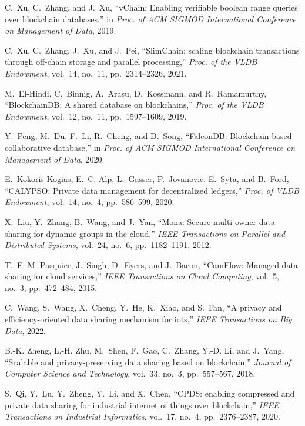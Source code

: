 \documentclass[11pt,divpdfm]{article}
\begin{document}
\begin{thebibliography}{10}
C.~Xu, C.~Zhang, and J.~Xu, ``{vChain}: Enabling verifiable boolean range
  queries over blockchain databases,'' in {\em Proc. of ACM SIGMOD
  International Conference on Management of Data}, 2019.

C.~Xu, C.~Zhang, J.~Xu, and J.~Pei, ``{SlimChain}: scaling blockchain
  transactions through off-chain storage and parallel processing,'' {\em Proc.
  of the VLDB Endowment}, vol.~14, no.~11, pp.~2314--2326, 2021.

M.~El-Hindi, C.~Binnig, A.~Arasu, D.~Kossmann, and R.~Ramamurthy,
  ``{BlockchainDB}: A shared database on blockchains,'' {\em Proc. of the VLDB
  Endowment}, vol.~12, no.~11, pp.~1597--1609, 2019.

Y.~Peng, M.~Du, F.~Li, R.~Cheng, and D.~Song, ``{FalconDB}: Blockchain-based
  collaborative database,'' in {\em Proc. of ACM SIGMOD International
  Conference on Management of Data}, 2020.

E.~Kokoris-Kogias, E.~C. Alp, L.~Gasser, P.~Jovanovic, E.~Syta, and B.~Ford,
  ``{CALYPSO}: Private data management for decentralized ledgers,'' {\em Proc.
  of VLDB Endowment}, vol.~14, no.~4, pp.~586--599, 2020.

X.~Liu, Y.~Zhang, B.~Wang, and J.~Yan, ``Mona: Secure multi-owner data sharing
  for dynamic groups in the cloud,'' {\em IEEE Transactions on Parallel and
  Distributed Systems}, vol.~24, no.~6, pp.~1182--1191, 2012.

T.~F.-M. Pasquier, J.~Singh, D.~Eyers, and J.~Bacon, ``{CamFlow}: Managed
  data-sharing for cloud services,'' {\em IEEE Transactions on Cloud
  Computing}, vol.~5, no.~3, pp.~472--484, 2015.

C.~Wang, S.~Wang, X.~Cheng, Y.~He, K.~Xiao, and S.~Fan, ``A privacy and
  efficiency-oriented data sharing mechanism for iots,'' {\em IEEE Transactions
  on Big Data}, 2022.

B.-K. Zheng, L.-H. Zhu, M.~Shen, F.~Gao, C.~Zhang, Y.-D. Li, and J.~Yang,
  ``Scalable and privacy-preserving data sharing based on blockchain,'' {\em
  Journal of Computer Science and Technology}, vol.~33, no.~3, pp.~557--567,
  2018.

S.~Qi, Y.~Lu, Y.~Zheng, Y.~Li, and X.~Chen, ``{CPDS}: enabling compressed and
  private data sharing for industrial internet of things over blockchain,''
  {\em IEEE Transactions on Industrial Informatics}, vol.~17, no.~4,
  pp.~2376--2387, 2020.


\end{thebibliography}
\end{document}

